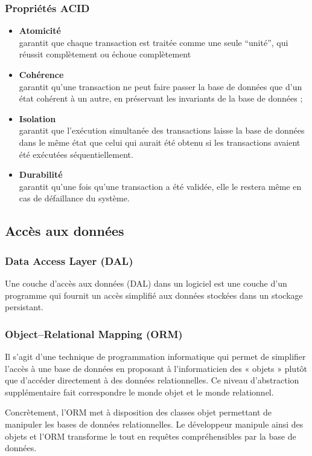 \begin{frame}
    \frametitle{Propriétés ACID}

    \begin{itemize}
        \item \textbf{Atomicité}\\
            garantit que chaque transaction est traitée comme une seule \enquote{unité},
            qui réussit complètement ou échoue complètement
        \item \textbf{Cohérence}\\
            garantit qu'une transaction ne peut faire passer la base de données que
            d'un état cohérent à un autre, en préservant les invariants de la base de données ;
        \item \textbf{Isolation}\\
            garantit que l'exécution simultanée des transactions laisse la base de données
            dans le même état que celui qui aurait été obtenu
            si les transactions avaient été exécutées séquentiellement.
        \item \textbf{Durabilité}\\
            garantit qu'une fois qu'une transaction a été validée,
            elle le restera même en cas de défaillance du système.
    \end{itemize}
\end{frame}


\subsection{Accès aux données}

\begin{frame}
    \frametitle{Data Access Layer (DAL)}

    Une couche d'accès aux données (DAL) dans un logiciel est une couche d'un programme qui fournit
    un accès simplifié aux données stockées dans un stockage persistant.
\end{frame}

\begin{frame}
    \frametitle{Object–Relational Mapping (ORM)}

    Il s’agit d’une technique de programmation informatique qui permet de simplifier
    l’accès à une base de données en proposant à l’informaticien des « objets »
    plutôt que d’accéder directement à des données relationnelles.
    Ce niveau d’abstraction supplémentaire fait correspondre
    le monde objet et le monde relationnel.

    \bigskip
    Concrètement, l’ORM met à disposition des classes objet
    permettant de manipuler les bases de données relationnelles.
    Le développeur manipule ainsi des objets et
    l’ORM transforme le tout en requêtes compréhensibles par la base de données.
\end{frame}

